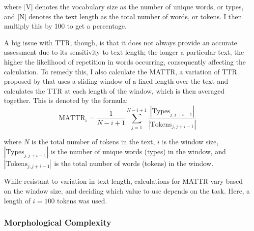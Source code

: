 \documentclass[12pt,a4paper]{article}
\numberwithin{figure}{section}
\numberwithin{table}{section}
\numberwithin{definition}{section}
\begin{document}
where \( |\text{V}| \) denotes the vocabulary size as the number of unique words, or types, and \( |\text{N}| \) denotes the text length as the total number of words, or tokens. I then multiply this by 100 to get a percentage. 

A big issue with TTR, though, is that it does not always provide an accurate assessment due to its sensitivity to text length; the longer a particular text, the higher the likelihood of repetition in words occurring, consequently affecting the calculation. To remedy this, I also calculate the MATTR, a variation of TTR proposed by \textcite{Covington2010article} that uses a sliding window of a fixed-length over the text and calculates the TTR at each length of the window, which is then averaged together. This is denoted by the formula: \[\text{MATTR}_i = \frac{1}{N - i + 1} \sum_{j=1}^{N-i+1} \frac{|\text{Types}_{j,j+i-1}|}{|\text{Tokens}_{j,j+i-1}|}\]

where \( N \) is the total number of tokens in the text, \( i \) is the window size, \( |\text{Types}_{j,j+i-1}| \) is the number of unique words (types) in the window, and \( |\text{Tokens}_{j,j+i-1}| \) is the total number of words (tokens) in the window.


While resistant to variation in text length, calculations for MATTR vary based on the window size, and deciding which value to use depends on the task. Here, a length of \( i = 100 \) tokens was used. 

\subsubsection{Morphological Complexity}
\label{ssec:morphologicalcomplexity}
\end{document}
